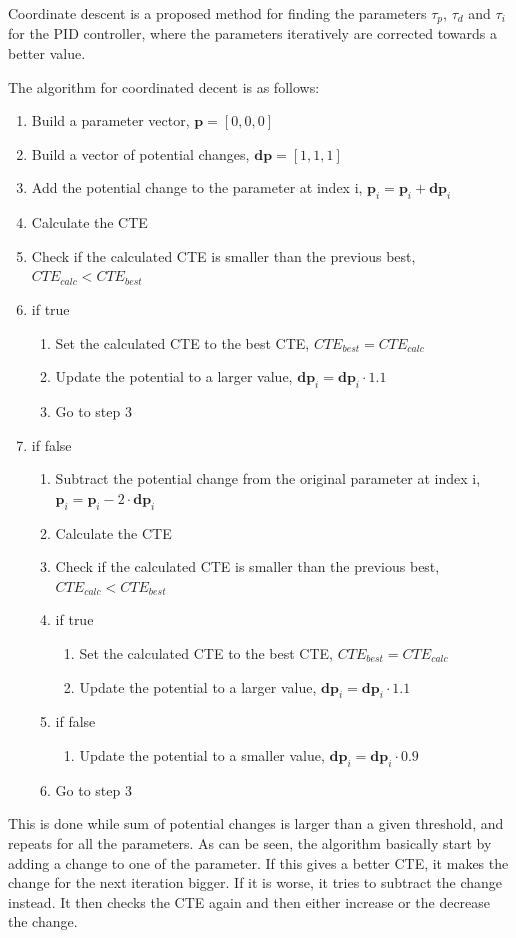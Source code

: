 \documentclass[Main]{subfiles}
\begin{document}
Coordinate descent is a proposed method for finding the parameters $\tau_p$, $\tau_d$ and $\tau_i$ for the PID controller, where the parameters iteratively are corrected towards a better value.

The algorithm for coordinated decent is as follows:
\begin{enumerate}
\item Build a parameter vector, $\mathbf{p} = [0,0,0]$
\item Build a vector of potential changes, $\mathbf{dp} = [1,1,1]$
\item Add the potential change to the parameter at index i, $\mathbf{p}_i = \mathbf{p}_i + \mathbf{dp}_i$
\item Calculate the CTE
\item Check if the calculated CTE is smaller than the previous best, $CTE_{calc} < CTE_{best}$
\item if true
\begin{enumerate}
	\item Set the calculated CTE to the best CTE, $CTE_{best} = CTE_{calc}$
	\item Update the potential to a larger value, $\mathbf{dp}_i = \mathbf{dp}_i \cdot 1.1$
	\item Go to step 3
\end{enumerate}
\item if false
\begin{enumerate}
	\item Subtract the potential change from the original parameter at index i, $\mathbf{p}_i = \mathbf{p}_i - 2 \cdot \mathbf{dp}_i$
	\item Calculate the CTE
	\item  Check if the calculated CTE is smaller than the previous best, $CTE_{calc} < CTE_{best}$
	\item if true
	\begin{enumerate}
		\item Set the calculated CTE to the best CTE, $CTE_{best} = CTE_{calc}$
		\item Update the potential to a larger value, $\mathbf{dp}_i = \mathbf{dp}_i \cdot 1.1$
	\end{enumerate}
	\item if false
	\begin{enumerate}
		\item Update the potential to a smaller value, $\mathbf{dp}_i = \mathbf{dp}_i \cdot 0.9$
	\end{enumerate}
	\item Go to step 3
\end{enumerate}
\end{enumerate} 
This is done while sum of potential changes is larger than a given threshold, and repeats for all the parameters.
As can be seen, the algorithm basically start by adding a change to one of the parameter.
If this gives a better CTE, it makes the change for the next iteration bigger.
If it is worse, it tries to subtract the change instead.
It then checks the CTE again and then either increase or the decrease the change. 
\end{document}
